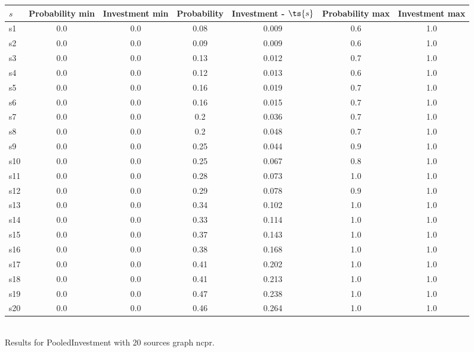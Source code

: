\documentclass{article}
\begin{document}
\noindent\begin{tabular}{|l|c|c|c|c|c|c|}
\hline
$s$& Probability min & Investment min & Probability & Investment - $\ts{s}$ & Probability max & Investment max\\
\hline
s1 &0.0 & 0.0 & 0.08 & 0.009 & 0.6 & 1.0\\
\hline
s2 &0.0 & 0.0 & 0.09 & 0.009 & 0.6 & 1.0\\
\hline
s3 &0.0 & 0.0 & 0.13 & 0.012 & 0.7 & 1.0\\
\hline
s4 &0.0 & 0.0 & 0.12 & 0.013 & 0.6 & 1.0\\
\hline
s5 &0.0 & 0.0 & 0.16 & 0.019 & 0.7 & 1.0\\
\hline
s6 &0.0 & 0.0 & 0.16 & 0.015 & 0.7 & 1.0\\
\hline
s7 &0.0 & 0.0 & 0.2 & 0.036 & 0.7 & 1.0\\
\hline
s8 &0.0 & 0.0 & 0.2 & 0.048 & 0.7 & 1.0\\
\hline
s9 &0.0 & 0.0 & 0.25 & 0.044 & 0.9 & 1.0\\
\hline
s10 &0.0 & 0.0 & 0.25 & 0.067 & 0.8 & 1.0\\
\hline
s11 &0.0 & 0.0 & 0.28 & 0.073 & 1.0 & 1.0\\
\hline
s12 &0.0 & 0.0 & 0.29 & 0.078 & 0.9 & 1.0\\
\hline
s13 &0.0 & 0.0 & 0.34 & 0.102 & 1.0 & 1.0\\
\hline
s14 &0.0 & 0.0 & 0.33 & 0.114 & 1.0 & 1.0\\
\hline
s15 &0.0 & 0.0 & 0.37 & 0.143 & 1.0 & 1.0\\
\hline
s16 &0.0 & 0.0 & 0.38 & 0.168 & 1.0 & 1.0\\
\hline
s17 &0.0 & 0.0 & 0.41 & 0.202 & 1.0 & 1.0\\
\hline
s18 &0.0 & 0.0 & 0.41 & 0.213 & 1.0 & 1.0\\
\hline
s19 &0.0 & 0.0 & 0.47 & 0.238 & 1.0 & 1.0\\
\hline
s20 &0.0 & 0.0 & 0.46 & 0.264 & 1.0 & 1.0\\
\hline
\end{tabular}\\

\noindent Results for PooledInvestment with 20 sources graph ncpr.
\end{document}
